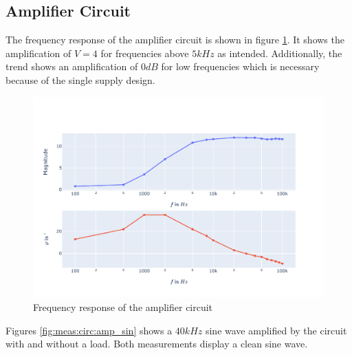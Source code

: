\subsection{Amplifier Circuit}

The frequency response of the amplifier circuit is shown in figure \ref{fig:meas:circ:amp_bode}. It shows the amplification of $V=4$ for frequencies above $5kHz$ as intended. Additionally, the trend shows an amplification of $0dB$ for low frequencies which is necessary because of the single supply design.
%
\begin{figure}
  \centering
  \includegraphics[height=\largeheight]{src/assets/pictures/measurements/amp_bode.pdf}
  \caption{Frequency response of the amplifier circuit}\label{fig:meas:circ:amp_bode}
\end{figure}
\p
Figures \ref{fig:meas:circ:amp_sin} shows a $40kHz$ sine wave amplified by the circuit with and without a load. Both measurements display a clean sine wave.
%
